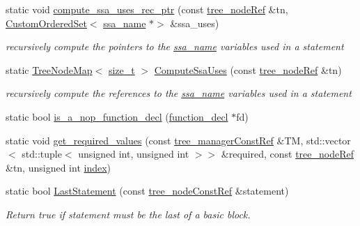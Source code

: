 \begin{DoxyCompactItemize}
static void \hyperlink{classtree__helper_aaa8a871e73116f94f3bb09dd4af063ef}{compute\+\_\+ssa\+\_\+uses\+\_\+rec\+\_\+ptr} (const \hyperlink{tree__node_8hpp_a6ee377554d1c4871ad66a337eaa67fd5}{tree\+\_\+node\+Ref} \&tn, \hyperlink{classCustomOrderedSet}{Custom\+Ordered\+Set}$<$ \hyperlink{structssa__name}{ssa\+\_\+name} $\ast$$>$ \&ssa\+\_\+uses)
\begin{DoxyCompactList}\small\item\em recursively compute the pointers to the \hyperlink{structssa__name}{ssa\+\_\+name} variables used in a statement \end{DoxyCompactList}\item 
static \hyperlink{classTreeNodeMap}{Tree\+Node\+Map}$<$ \hyperlink{tutorial__fpt__2017_2intro_2sixth_2test_8c_a7c94ea6f8948649f8d181ae55911eeaf}{size\+\_\+t} $>$ \hyperlink{classtree__helper_a8c3efd03b279f356eb1c2beacb6b4eaf}{Compute\+Ssa\+Uses} (const \hyperlink{tree__node_8hpp_a6ee377554d1c4871ad66a337eaa67fd5}{tree\+\_\+node\+Ref} \&tn)
\begin{DoxyCompactList}\small\item\em recursively compute the references to the \hyperlink{structssa__name}{ssa\+\_\+name} variables used in a statement \end{DoxyCompactList}\item 
static bool \hyperlink{classtree__helper_abfafd9aff94ad9bc9d4cd8aee81e044e}{is\+\_\+a\+\_\+nop\+\_\+function\+\_\+decl} (\hyperlink{structfunction__decl}{function\+\_\+decl} $\ast$fd)
\item 
static void \hyperlink{classtree__helper_ac6e0286958beccf450e505d7c56fef6f}{get\+\_\+required\+\_\+values} (const \hyperlink{tree__manager_8hpp_a792e3f1f892d7d997a8d8a4a12e39346}{tree\+\_\+manager\+Const\+Ref} \&TM, std\+::vector$<$ std\+::tuple$<$ unsigned int, unsigned int $>$$>$ \&required, const \hyperlink{tree__node_8hpp_a6ee377554d1c4871ad66a337eaa67fd5}{tree\+\_\+node\+Ref} \&tn, unsigned int \hyperlink{tutorial__pact__2019_2Introduction_2third_2include_2Keccak_8h_a028c9bdc8344cca38ab522a337074797}{index})
\item 
static bool \hyperlink{classtree__helper_aea2c2c5f7d79071fd7ae3f755aedb760}{Last\+Statement} (const \hyperlink{tree__node_8hpp_a3cf5d02292c940f3892425a5b5fdec3c}{tree\+\_\+node\+Const\+Ref} \&statement)
\begin{DoxyCompactList}\small\item\em Return true if statement must be the last of a basic block. \end{DoxyCompactList}\item 

\end{DoxyCompactItemize}
